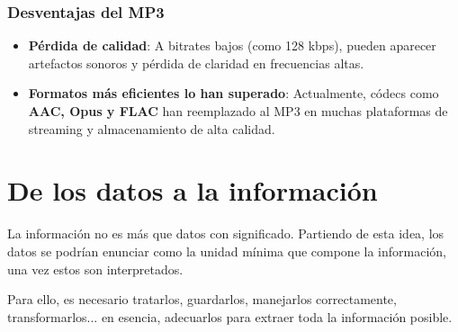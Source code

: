 \subsubsection{Desventajas del MP3}
\begin{itemize}
    \item \textbf{Pérdida de calidad}: A bitrates bajos (como 128 kbps), pueden aparecer artefactos sonoros y pérdida de claridad en frecuencias altas.
    \item \textbf{Formatos más eficientes lo han superado}: Actualmente, códecs como \textbf{AAC, Opus y FLAC} han reemplazado al MP3 en muchas plataformas de streaming y almacenamiento de alta calidad.
\end{itemize}



\section{De los datos a la información}

La información no es más que datos con significado. Partiendo de esta idea, los datos se podrían enunciar como la unidad mínima que compone la información, una vez estos son interpretados.

Para ello, es necesario tratarlos, guardarlos, manejarlos correctamente, transformarlos... en esencia, adecuarlos para extraer toda la información posible.


